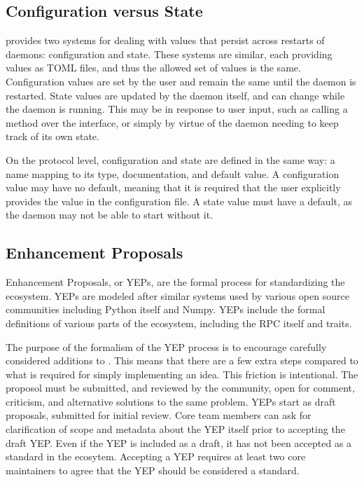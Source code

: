 \subsection{Configuration versus State}

\yaq{} provides two systems for dealing with values that persist across restarts of daemons: configuration and state.
These systems are similar, each providing values as TOML files, and thus the allowed set of values is the same.
Configuration values are set by the user and remain the same until the daemon is restarted.
State values are updated by the daemon itself, and can change while the daemon is running.
This may be in response to user input, such as calling a method over the \yaq{} interface, or simply by virtue of the daemon needing to keep track of its own state.

On the protocol level, configuration and state are defined in the same way: a name mapping to its type, documentation, and default value.
A configuration value may have no default, meaning that it is required that the user explicitly provides the value in the configuration file.
A state value must have a default, as the daemon may not be able to start without it.

\subsection{\yaq{} Enhancement Proposals}

\yaq{} Enhancement Proposals, or YEPs, are the formal process for standardizing the \yaq{} ecosystem.
YEPs are modeled after similar systems used by various open source communities including Python itself\cite{pep0} and Numpy\cite{neps}.
YEPs include the formal definitions of various parts of the \yaq{} ecosystem, including the RPC itself and traits.

The purpose of the formalism of the YEP process is to encourage carefully considered additions to \yaq{}.
This means that there are a few extra steps compared to what is required for simply implementing an idea.
This friction is intentional.
The proposol must be submitted, and reviewed by the community, open for comment, criticism, and alternative solutions to the same problem.
YEPs start as draft proposals, submitted for initial review.
Core team members can ask for clarification of scope and metadata about the YEP itself prior to accepting the draft YEP.
Even if the YEP is included as a draft, it has not been accepted as a standard in the \yaq{} ecosytem.
Accepting a YEP requires at least two core maintainers to agree that the YEP should be considered a standard.


